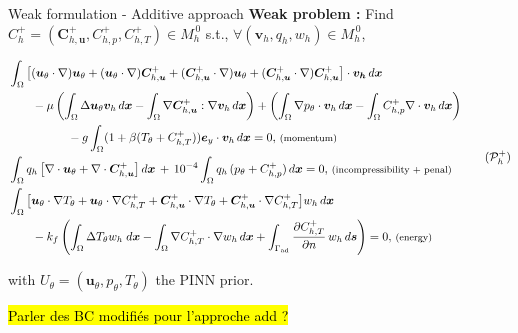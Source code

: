 \begin{frame}{Weak formulation - Additive approach}
    \textbf{Weak problem :} Find $C_h^+=(\bm{C}_{h,\bm{u}}^+, C_{h,p}^+, C_{h,T}^+) \in M_h^{\, 0}$ s.t., \; $\forall (\bm{v}_h, q_h, w_h) \in M_h^{\, 0}$,

    \vspace{-4pt}
    \footnotesize
    \begin{equation}
        \label{eq:weak_pb_add}
        \hspace{-2pt}\begin{aligned}
            &\int_\Omega \big[(\bm{u}_\theta \cdot \nabla)\bm{u}_\theta + (\bm{u}_\theta \cdot \nabla)\bm{C}_{h,\bm{u}}^+ + (\bm{C}_{h,\bm{u}}^+ \cdot \nabla)\bm{u}_\theta + (\bm{C}_{h,\bm{u}}^+ \cdot \nabla)\bm{C}_{h,\bm{u}}^+ \big] \cdot \bm{v_h} \, d\bm{x} \\
            &\hspace{20pt} -\mu \left(\int_\Omega  \Delta \bm{u}_\theta \bm{v}_h \, d\bm{x} - \int_\Omega \nabla \bm{C}_{h,\bm{u}}^+ : \nabla \bm{v}_h \, d\bm{x}\right) + \left(\int_\Omega \nabla p_\theta \cdot \bm{v}_h \, d\bm{x} - \int_\Omega C_{h,p}^+ \nabla \cdot \bm{v}_h \, d\bm{x}\right)\\
            &\hspace{50pt} - g \int_\Omega (1 + \beta (T_\theta + C_{h,T}^+)) \bm{e}_y \cdot \bm{v}_h \, d\bm{x} = 0, \,\text{\footnotesize (momentum)}  \\
            &\int_\Omega q_h \, \big[\nabla \cdot \bm{u}_\theta + \nabla \cdot \bm{C}_{h,\bm{u}}^+\big] \, d\bm{x} \, + \, 10^{-4} \int_\Omega q_h \, (p_\theta + C_{h,p}^+) \, d\bm{x} = 0, \,\text{\footnotesize (incompressibility + penal)} \\
            & \int_\Omega \big[ \bm{u}_\theta \cdot \nabla T_\theta + \bm{u}_\theta \cdot \nabla C_{h,T}^+ + \bm{C}_{h,\bm{u}}^+ \cdot \nabla T_\theta + \bm{C}_{h,\bm{u}}^+ \cdot \nabla C_{h,T}^+ \big] w_h \, d\bm{x} \\
            & \hspace{20pt} - k_f \left(\int_\Omega \Delta T_\theta w_h \; d\bm{x}- \int_\Omega \nabla C_{h,T}^+ \cdot \nabla w_h \, d\bm{x} + \int_{\Gamma_\text{ad}} \frac{\partial C_{h,T}^+}{\partial n} \, w_h \, d\bm{s}\right) = 0, \,\text{\footnotesize (energy)}
        \end{aligned}
        \tag{$\mathcal{P}_h^+$}
    \end{equation}

    \vspace{5pt}
    with $U_\theta = (\bm{u}_\theta, p_\theta, T_\theta)$ the PINN prior.

    \hl{Parler des BC modifiés pour l'approche add ?}
\end{frame}

